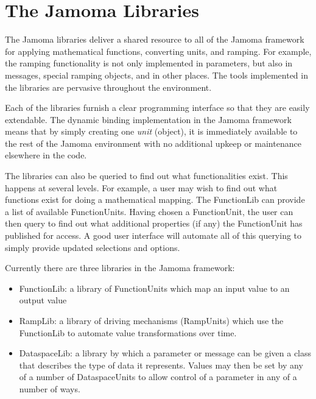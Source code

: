 \documentclass{article}
\begin{document}
\section{The Jamoma Libraries} %
\label{sec:the_jamoma_libraries}

The Jamoma libraries deliver a shared resource to all of the Jamoma framework for applying mathematical functions, converting units, and ramping. For example, the ramping functionality is not only implemented in parameters, but also in messages, special ramping objects, and in other places. The tools implemented in the libraries are pervasive throughout the environment.

Each of the libraries furnish a clear programming interface so that they are easily extendable. The dynamic binding implementation in the Jamoma framework means that by simply creating one \emph{unit} (object), it is immediately available to the rest of the Jamoma environment with no additional upkeep or maintenance elsewhere in the code.

The libraries can also be queried to find out what functionalities exist. This happens at several levels.  For example, a user may wish to find out what functions exist for doing a mathematical mapping. The FunctionLib can provide a list of available FunctionUnits. Having chosen a FunctionUnit, the user can then query to find out what additional properties (if any) the FunctionUnit has published for access. A good user interface will automate all of this querying to simply provide updated selections and options.

Currently there are three libraries in the Jamoma framework:
\begin{itemize}
	\item FunctionLib: a library of FunctionUnits which map an input value to an output value
	\item RampLib: a library of driving mechanisms (RampUnits) which use the FunctionLib to automate value transformations over time.
	\item DataspaceLib: a library by which a parameter or message can be given a class that describes the type of data it represents.  Values may then be set by any of a number of DataspaceUnits to allow control of a parameter in any of a number of ways.
\end{itemize}
\end{document}
